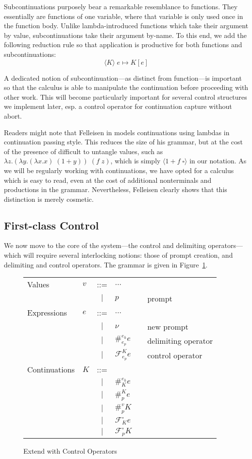 \documentclass[11pt]{article}
\newcommand{\maybePage}{\newpage}
\newcommand\x{\lambda x}
\newcommand\F{\mathcal{F}}
\newcommand{\angles}[1]{\langle#1\rangle}
\begin{document}
Subcontinuations purposely bear a remarkable resemblance to functions.
They essentially are functions of one variable, where that variable is only used once in the function body.
Unlike lambda-introduced functions which take their argument by value, subcontinuations take their argument by-name.
To this end, we add the following reduction rule so that application is productive for both functions and subcontinuations:
$$\angles{K}\;e \mapsto K[e]$$

A dedicated notion of subcontinuation---as distinct from function---is important so that the calculus is able to manipulate the continuation before proceeding with other work.
This will become particularly important for several control structures we implement later, esp. a control operator for continuation capture without abort.

Readers might note that Felleisen in \cite{PromptApplication} models continuations using lambdas in continuation passing style.
This reduces the size of his grammar, but at the cost of the presence of difficult to untangle values, such as $\lambda z.(\lambda y.(\x.x)\;(1+y))\;(f\;z)$, which is simply $\angles{1 + f\;\square}$ in our notation.
As we will be regularly working with continuations, we have opted for a calculus which is easy to read, even at the cost of additional nonterminals and productions in the grammar.
Nevertheless, Felleisen clearly shows that this distinction is merely cosmetic.


\maybePage
\subsection{First-class Control}

We now move to the core of the system---the control and delimiting operators---which will require several interlocking notions:
those of prompt creation, and delimiting and control operators.
The grammar is given in Figure~\ref{fig:addControl}.

\begin{figure}[H]
\caption{Extend with Control Operators}
\label{fig:addControl}

\begin{tabular}{llclll}
Values & $v$ & ::= & $\ldots$ \\
& & $|$ & $p$ && prompt \\
Expressions & $e$ & ::= & $\ldots$ \\
& & $|$ & $\nu$ && new prompt \\
& & $|$ & $\#_{e_p}^{e_h}e$ && delimiting operator \\
& & $|$ & $\F_{e_p}^Ke$ && control operator \\
Continuations & $K$ & ::= & \\
& & $|$ & $\#_{K}^{e_h}e$ &&  \\
& & $|$ & $\#_{p}^{K}e$ &&  \\
& & $|$ & $\#_{p}^{v}K$ &&  \\
& & $|$ & $\F_{K}^{\square}e$ &&  \\
& & $|$ & $\F_{p}^{\square}K$ &&  \\
\end{tabular}
\end{figure}
\end{document}
